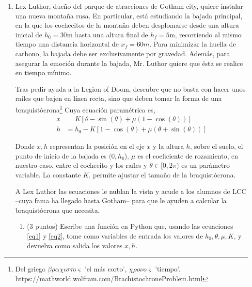 \begin{enumerate}
	\item Lex Luthor, dueño del parque de atracciones de Gotham city, quiere instalar una nueva montaña rusa. En particular, está estudiando la bajada principal, en la que los cochecitos de la montaña deben desplomarse desde una altura inicial de $h_0=30$m hasta una altura final de $h_f=5$m, recorriendo al mismo tiempo una distancia horizontal de $x_f =60m$. Para minimizar la huella de carbono, la bajada debe ser exclusivamente por gravedad. Además, para asegurar la emoción durante la bajada, Mr. Luthor quiere que ésta se realice en tiempo mínimo.
	
	Tras pedir ayuda a la Legion of Doom, descubre que no basta con hacer unos raíles que bajen en línea recta, sino que deben tomar la forma de una braquistócrona\footnote{Del griego $\beta \rho \alpha \chi \iota  \sigma \tau o \varsigma$ 'el más corto', $\chi \rho o \nu o \varsigma$ 'tiempo'. https://mathworld.wolfram.com/BrachistochroneProblem.html} Cuya ecuación paramétrica es,
	\begin{align}
		x &= K[\theta-\sin(\theta) + \mu(1-\cos(\theta))] \label{eq1} \\
		h &= h_0 -K[1-\cos(\theta) + \mu(\theta+\sin(\theta))] \label{eq2}
	\end{align}
	
	Donde $x,h$ representan la posición en el eje $x$ y la altura $h$, sobre el suelo, el punto de inicio de la bajada es $(0,h_0$), $\mu$ es el coeficiente de rozamiento, en nuestro caso,  entre el cochecito y los raíles y $\theta \in [0,2\pi)$ es un parámetro variable. La constante $K$, permite ajustar el tamaño de la braquistócrona.     
	
	A Lex Luthor las ecuaciones le nublan la vista y acude a los alumnos de LCC --cuya fama ha llegado hasta Gotham-- para que le ayuden a calcular la braquistócrona que necesita.
	\begin{enumerate}
		\item (3 puntos) Escribe una función en Python que, usando las ecuaciones \ref{eq1} y \ref{eq2}, tome como variables de entrada los valores de $h_0,\theta, \mu, K$, y devuelva como salida los valores $x,h$.
		

\end{enumerate}
\end{enumerate}
